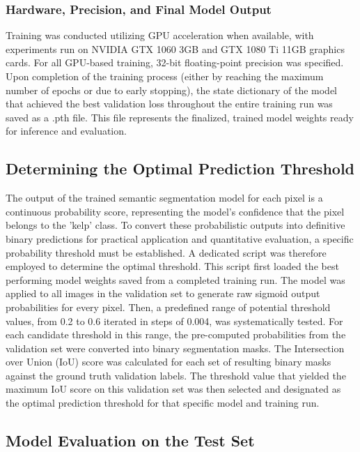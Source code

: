\documentclass{article}
\begin{document}
\subsubsection{Hardware, Precision, and Final Model Output}

Training was conducted utilizing GPU acceleration when available, with experiments run on NVIDIA GTX 1060 3GB and GTX 1080 Ti 11GB graphics cards. For all GPU-based training, 32-bit floating-point precision was specified. Upon completion of the training process (either by reaching the maximum number of epochs or due to early stopping), the state dictionary of the model that achieved the best validation loss throughout the entire training run was saved as a .pth file. This file represents the finalized, trained model weights ready for inference and evaluation.

\subsection{Determining the Optimal Prediction Threshold}

The output of the trained semantic segmentation model for each pixel is a continuous probability score, representing the model's confidence that the pixel belongs to the 'kelp' class. To convert these probabilistic outputs into definitive binary predictions for practical application and quantitative evaluation, a specific probability threshold must be established. A dedicated script was therefore employed to determine the optimal threshold. This script first loaded the best performing model weights saved from a completed training run. The model was applied to all images in the validation set to generate raw sigmoid output probabilities for every pixel. Then, a predefined range of potential threshold values, from 0.2 to 0.6 iterated in steps of 0.004, was systematically tested. For each candidate threshold in this range, the pre-computed probabilities from the validation set were converted into binary segmentation masks. The Intersection over Union (IoU) score was calculated for each set of resulting binary masks against the ground truth validation labels. The threshold value that yielded the maximum IoU score on this validation set was then selected and designated as the optimal prediction threshold for that specific model and training run.

\subsection{Model Evaluation on the Test Set}
\end{document}
